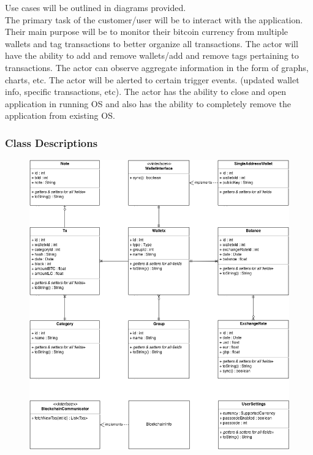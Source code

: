 Use cases will be outlined in diagrams provided.\\ 

The primary task of the customer/user will be to interact with the application.  Their main purpose will be to monitor their bitcoin currency from multiple wallets and tag transactions to better organize all transactions.  The actor will have the ability to add and remove wallets/add and remove tags pertaining to transactions. The actor can observe aggregate information in the form of graphs, charts, etc.  The actor will be alerted to certain trigger events. (updated wallet info, specific transactions, etc).  The actor has the ability to close and open application in running OS and also has the ability to completely remove the application from existing OS. \\
	
	
    \subsubsection{Class Descriptions}
      \begin{figure}[H]
        \includegraphics[width=1.0\textwidth]{../diagrams/classes_model.png}
      \end{figure}


